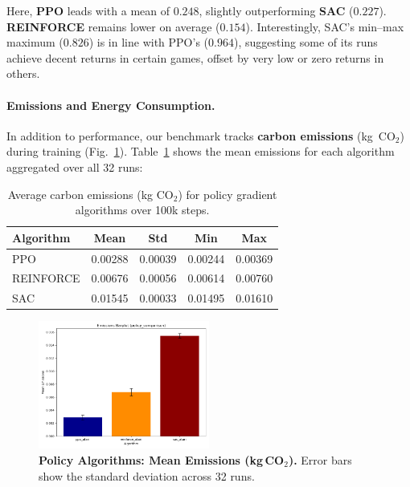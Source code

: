 \noindent
Here, \textbf{PPO} leads with a mean of $0.248$, slightly outperforming \textbf{SAC} ($0.227$). \textbf{REINFORCE} remains lower on average ($0.154$). Interestingly, SAC’s min–max maximum ($0.826$) is in line with PPO’s ($0.964$), suggesting some of its runs achieve decent returns in certain games, offset by very low or zero returns in others.

\paragraph{Emissions and Energy Consumption.}
In addition to performance, our benchmark tracks \textbf{carbon emissions} (kg~CO$_2$) during training (Fig.~\ref{fig:policy_emissions_bar}). Table~\ref{tab:policy_emissions} shows the mean emissions for each algorithm aggregated over all 32 runs:

\begin{table} 
	\centering
	\caption{Average carbon emissions (kg CO$_2$) for policy gradient algorithms over 100k steps.}
	\label{tab:policy_emissions}
	\begin{tabular}{lcccc}
		\toprule
		\textbf{Algorithm} & \textbf{Mean} & \textbf{Std} & \textbf{Min} & \textbf{Max} \\
		\midrule
		PPO         & 0.00288 & 0.00039 & 0.00244 & 0.00369 \\
		REINFORCE   & 0.00676 & 0.00056 & 0.00614 & 0.00760 \\
		SAC         & 0.01545 & 0.00033 & 0.01495 & 0.01610 \\
		\bottomrule
	\end{tabular}
\end{table}

\begin{figure} 
	\centering
	\includegraphics[width=0.5\textwidth]{figures/policy_comparison/barplot_emissions_policy_comparison.png}
	\caption{\textbf{Policy Algorithms: Mean Emissions (kg\,CO$_2$).} Error bars show the standard deviation across 32 runs.}
	\label{fig:policy_emissions_bar}
\end{figure}

